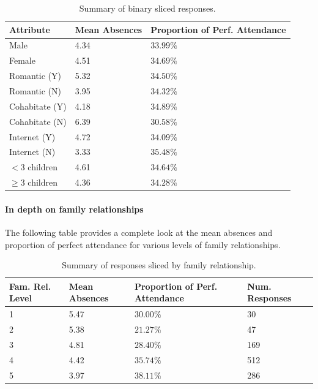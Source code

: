\documentclass[12pt, titlepage]{article}
\begin{document}
	\begin{table}[h!]
		\centering
		\begin{tabular}{|l|l|l|}
			\hline
			Attribute & Mean Absences & Proportion of Perf. Attendance \\
			\hline
			Male & 4.34 & $33.99\%$ \\
			Female & 4.51 & $34.69\%$ \\
			\hline
			Romantic (Y) & 5.32 & $34.50\%$ \\
			Romantic (N) & 3.95 & $34.32\%$ \\
			\hline
			Cohabitate (Y) & 4.18 & $34.89\%$ \\
			Cohabitate (N) & 6.39 & $30.58\%$ \\
			\hline
			Internet (Y) & 4.72 & $34.09\%$ \\
			Internet (N) & 3.33 & $35.48\%$ \\
			\hline
			$<3$ children & 4.61 & $34.64\%$ \\
			$\geq 3$ children & 4.36 & $34.28\%$ \\
			\hline
		\end{tabular}
	\caption{Summary of binary sliced responses.}
	\end{table}
	
	\paragraph{In depth on family relationships} The following table provides a complete look at the mean absences and proportion of perfect attendance for various levels of family relationships.
	
	\begin{table}[h!]
		\begin{tabular}{|l|l|l|l|}
			\hline
			Fam. Rel. Level & Mean Absences & Proportion of Perf. Attendance & Num. Responses \\
			\hline
			1 & 5.47 & $30.00\%$ & 30 \\
			2 & 5.38 & $21.27\%$ & 47 \\
			3 & 4.81 & $28.40\%$ & 169 \\
			4 & 4.42 & $35.74\%$ & 512 \\
			5 & 3.97 & $38.11\%$ & 286 \\
			\hline
		\end{tabular}
	\caption{Summary of responses sliced by family relationship.}
	\end{table}
\end{document}
